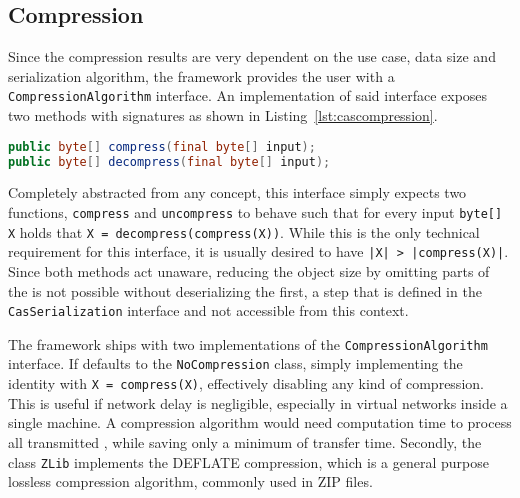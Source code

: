 \subsection{Compression}
Since the compression results are very dependent on the use case, data size and serialization algorithm, the framework provides the user with a \lstinline|CompressionAlgorithm| interface. An implementation of said interface exposes two methods with signatures as shown in Listing~\ref{lst:cascompression}.
\begin{lstlisting}[language=Java,caption={CompressionAlgorithm method signatures},label=lst:cascompression]
public byte[] compress(final byte[] input);
public byte[] decompress(final byte[] input);
\end{lstlisting}
Completely abstracted from any \uima{} concept, this interface simply expects two functions, \lstinline|compress| and \lstinline|uncompress| to behave such that for every input \lstinline|byte[] X| holds that \lstinline|X = decompress(compress(X))|. While this is the only technical requirement for this interface, it is usually desired to have \lstinline+|X| > |compress(X)|+. Since both methods act \uima{} unaware, reducing the object size by omitting parts of the \cas{} is not possible without deserializing the \cas{} first, a step that is defined in the \lstinline|CasSerialization| interface and not accessible from this context. 

The framework ships with two implementations of the \lstinline|CompressionAlgorithm| interface. If defaults to the \lstinline|NoCompression| class, simply implementing the identity with \lstinline|X = compress(X)|, effectively disabling any kind of compression. This is useful if network delay is negligible, especially in virtual networks inside a single machine. A compression algorithm would need computation time to process all transmitted \cas{}, while saving only a minimum of transfer time. Secondly, the class \lstinline|ZLib| implements the DEFLATE compression, which is a general purpose lossless compression algorithm, commonly used in ZIP files.

